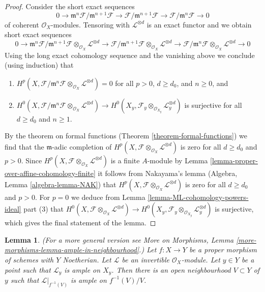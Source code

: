\documentclass{stacks-project}
\theoremstyle{plain}
\newtheorem{lemma}[subsection]{Lemma}
\theoremstyle{definition}
\theoremstyle{remark}
\numberwithin{equation}{subsection}
\begin{document}
\begin{proof}
\medskip\noindent
Consider the short exact sequences
$$
0 \to \mathfrak m^n\mathcal{F}/\mathfrak m^{n + 1} \mathcal{F}
\to \mathcal{F}/\mathfrak m^{n + 1} \mathcal{F}
\to \mathcal{F}/\mathfrak m^n \mathcal{F} \to 0
$$
of coherent $\mathcal{O}_X$-modules. Tensoring with $\mathcal{L}^{\otimes d}$
is an exact functor and we obtain short exact sequences
$$
0 \to
\mathfrak m^n\mathcal{F}/\mathfrak m^{n + 1} \mathcal{F}
\otimes_{\mathcal{O}_X} \mathcal{L}^{\otimes d}
\to \mathcal{F}/\mathfrak m^{n + 1} \mathcal{F}
\otimes_{\mathcal{O}_X} \mathcal{L}^{\otimes d}
\to \mathcal{F}/\mathfrak m^n \mathcal{F}
\otimes_{\mathcal{O}_X} \mathcal{L}^{\otimes d} \to 0
$$
Using the long exact cohomology sequence and the vanishing above
we conclude (using induction) that
\begin{enumerate}
\item $H^p(X, \mathcal{F}/\mathfrak m^n \mathcal{F}
\otimes_{\mathcal{O}_X} \mathcal{L}^{\otimes d}) = 0$
for all $p > 0$, $d \geq d_0$, and $n \geq 0$, and
\item $H^0(X, \mathcal{F}/\mathfrak m^n \mathcal{F}
\otimes_{\mathcal{O}_X} \mathcal{L}^{\otimes d}) \to
H^0(X_y, \mathcal{F}_y \otimes_{\mathcal{O}_{X_y}} \mathcal{L}_y^{\otimes d})$
is surjective for all $d \geq d_0$ and $n \geq 1$.
\end{enumerate}
By the theorem on formal functions (Theorem \ref{theorem-formal-functions})
we find that the $\mathfrak m$-adic completion of
$H^p(X, \mathcal{F} \otimes_{\mathcal{O}_X} \mathcal{L}^{\otimes d})$
is zero for all $d \geq d_0$ and $p > 0$.
Since $H^p(X, \mathcal{F} \otimes_{\mathcal{O}_X} \mathcal{L}^{\otimes d})$
is a finite $A$-module by
Lemma \ref{lemma-proper-over-affine-cohomology-finite}
it follows from Nakayama's lemma (Algebra, Lemma \ref{algebra-lemma-NAK})
that $H^p(X, \mathcal{F} \otimes_{\mathcal{O}_X} \mathcal{L}^{\otimes d})$
is zero for all $d \geq d_0$ and $p > 0$.
For $p = 0$ we deduce from
Lemma \ref{lemma-ML-cohomology-powers-ideal} part (3)
that $H^0(X, \mathcal{F} \otimes_{\mathcal{O}_X} \mathcal{L}^{\otimes d}) \to
H^0(X_y, \mathcal{F}_y \otimes_{\mathcal{O}_{X_y}} \mathcal{L}_y^{\otimes d})$
is surjective, which gives the final statement of the lemma.
\end{proof}

\begin{lemma}
\label{lemma-ample-in-neighbourhood}
(For a more general version see
More on Morphisms,
Lemma \ref{more-morphisms-lemma-ample-in-neighbourhood}.)
Let $f : X \to Y$ be a proper morphism of schemes with $Y$ Noetherian.
Let $\mathcal{L}$ be an invertible $\mathcal{O}_X$-module.
Let $y \in Y$ be a point such that $\mathcal{L}_y$ is ample
on $X_y$. Then there is an open neighbourhood $V \subset Y$
of $y$ such that $\mathcal{L}|_{f^{-1}(V)}$ is ample on $f^{-1}(V)/V$.
\end{lemma}
\end{document}
